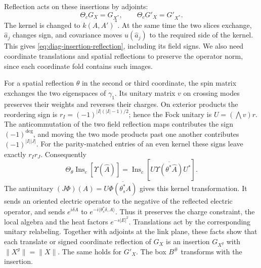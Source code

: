 Reflection acts on these insertions by adjoints:
\begin{equation}\label{eq:diag-insertion-reflection}
 \Theta_cG_X=G_{X^*},\qquad\Theta_cG'_X=G'_{X^*}.
\end{equation}
The kernel is changed to $k(A,A')^*$. At the same time the two
slices exchange, $\widehat a_j$ changes sign, and covariance moves
$u(\widehat a_j)$ to the required side of the kernel. This gives
\eqref{eq:diag-insertion-reflection}, including its field signs.
We also need coordinate translations and spatial reflections to
preserve the operator norm, since each coordinate fold contains
such images.

For a spatial reflection $\theta$ in the second or third coordinate,
the spin matrix exchanges the two eigenspaces of $\gamma_1$.
Its unitary matrix $v$ on crossing modes preserves their weights
and reverses their charges. On exterior products the reordering
sign is $r_I=(-1)^{|I|(|I|-1)/2}$; hence the Fock unitary is
$U=(\bigwedge v)r$. The anticommutation of the two field reflection
maps contributes the sign $(-1)^{\deg}$, and moving the two mode
products past one another contributes $(-1)^{|I||J|}$. For the
parity-matched entries of an even kernel these signs leave exactly
$r_Ir_J$. Consequently
\[
 \Theta_\theta\operatorname{Ins}_c[\Upsilon(\widehat A)]
 =\operatorname{Ins}_c[
       U\overline{\Upsilon(\theta^*\widehat A)}U^*].
\]
The antiunitary
$(J\Phi)(A)=U\overline{\Phi(\theta_s^*A)}$ gives this kernel
transformation. It sends an oriented electric operator to the
negative of the reflected electric operator, and sends
$e^{i\delta A}$ to $e^{-i\langle\theta_s^*\delta,A\rangle}$.
Thus it preserves the charge constraint, the local algebra and
the heat factors $e^{-s|E|^2}$. Translations act by the corresponding
unitary relabeling. Together with adjoints at the link plane, these
facts show that each translate or signed coordinate reflection
of $G_X$ is an insertion $G_{X^g}$ with
$\|X^g\|=\|X\|$. The same holds for $G'_X$. The box $B^\#$
transforms with the insertion.

